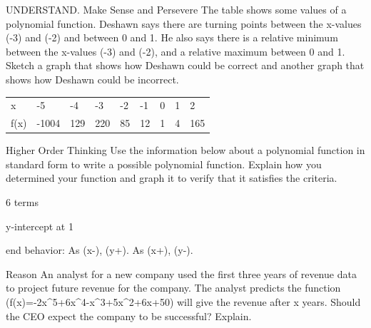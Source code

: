 \documentclass{article}
\newenvironment{practice}[2]{}{}        %
\newcommand{\answer}[1]{}               %
\newcommand{\placeholder}[2]{}          %
\begin{document}
\begin{practice}{13}{2}
UNDERSTAND. Make Sense and Persevere The table shows some values of a polynomial function. Deshawn says there are turning points between the x-values (-3) and (-2) and between 0 and 1. He also says there is a relative minimum between the x-values (-3) and (-2), and a relative maximum between 0 and 1. Sketch a graph that shows how Deshawn could be correct and another graph that shows how Deshawn could be incorrect.
\begin{tabular}{lllllllll}
x & -5 & -4 & -3 & -2 & -1 & 0 & 1 & 2 \\
f(x) & -1004 & 129 & 220 & 85 & 12 & 1 & 4 & 165 \\
\end{tabular}
\answer{Check students' graphs.}
\end{practice}
\begin{practice}{14}{3}
Higher Order Thinking Use the information below about a polynomial function in standard form to write a possible polynomial function. Explain how you determined your function and graph it to verify that it satisfies the criteria.
\item 6 terms
\item y-intercept at 1
\item end behavior: As (x\to-\infty), (y\to+\infty). As (x\to+\infty), (y\to-\infty).
\answer{(f(x)=-2x^5+2x^4-2x^3+x^2-x+1); The polynomial function must have a negative leading coefficient and an odd degree because of the end behavior. The function must have a degree of at least 5 because there are 6 terms. The last term of the function is 1 because the y-intercept is (0,1).}
\placeholder{graph}{Answer 14 on PDF page 19: red quintic (f(x)=-2x^5+2x^4-2x^3+x^2-x+1), descending from upper left to lower right, with arrows on both ends. Black x- and y-axes with arrowheads; square grid at unit intervals, window approximately [-5,5] on both axes, labels -4,-2,2,4 and O at the origin. Curve passes through (0,1) and crosses the x-axis between 0 and 1.}
\end{practice}
\begin{practice}{15}{3}
Reason An analyst for a new company used the first three years of revenue data to project future revenue for the company. The analyst predicts the function (f(x)=-2x^5+6x^4-x^3+5x^2+6x+50) will give the revenue after x years. Should the CEO expect the company to be successful? Explain.
\answer{No; the end behavior of the function when x approaches infinity is negative infinity. The revenue earned by the company will be negative.}
\end{practice}
\end{document}
